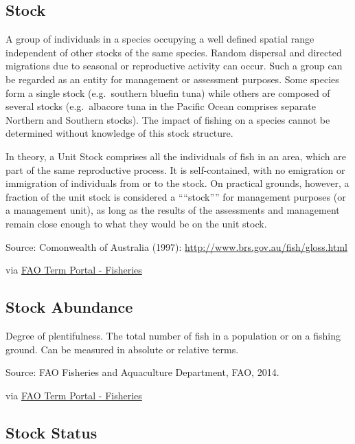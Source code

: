 \documentclass[
  11pt,
]{book}
\begin{document}
\hypertarget{stock}{%
\subsection{Stock}\label{stock}}

A group of individuals in a species occupying a well defined spatial range independent of other stocks of the same species. Random dispersal and directed migrations due to seasonal or reproductive activity can occur. Such a group can be regarded as an entity for management or assessment purposes. Some species form a single stock (e.g.~southern bluefin tuna) while others are composed of several stocks (e.g.~albacore tuna in the Pacific Ocean comprises separate Northern and Southern stocks). The impact of fishing on a species cannot be determined without knowledge of this stock structure.

In theory, a Unit Stock comprises all the individuals of fish in an area, which are part of the same reproductive process. It is self-contained, with no emigration or immigration of individuals from or to the stock. On practical grounds, however, a fraction of the unit stock is considered a ````stock'''' for management purposes (or a management unit), as long as the results of the assessments and management remain close enough to what they would be on the unit stock.

Source: Comonwealth of Australia (1997): \url{http://www.brs.gov.au/fish/gloss.html}

via \href{http://www.fao.org/fishery/glossary/en}{FAO Term Portal - Fisheries}

\hypertarget{stock-abundance}{%
\subsection{Stock Abundance}\label{stock-abundance}}

Degree of plentifulness. The total number of fish in a population or on a fishing ground. Can be measured in absolute or relative terms.

Source: FAO Fisheries and Aquaculture Department, FAO, 2014.

via \href{http://www.fao.org/fishery/glossary/en}{FAO Term Portal - Fisheries}

\hypertarget{stock-status}{%
\subsection{Stock Status}\label{stock-status}}
\end{document}
